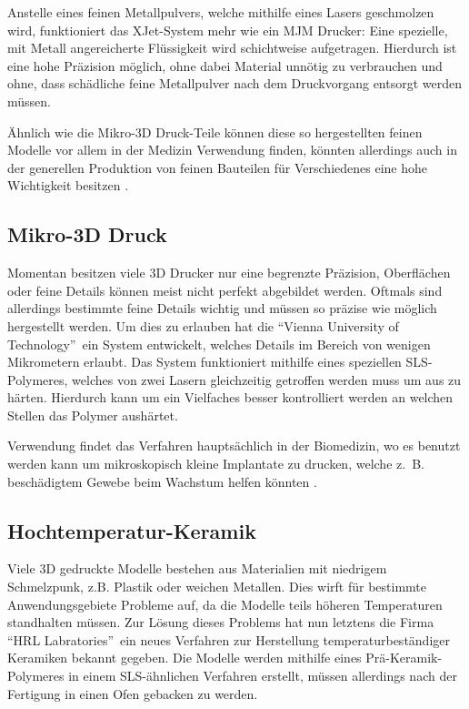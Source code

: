 Anstelle eines feinen Metallpulvers, welche mithilfe eines Lasers geschmolzen wird, funktioniert das XJet-System mehr wie ein MJM Drucker: Eine spezielle, mit Metall angereicherte Flüssigkeit wird schichtweise aufgetragen. Hierdurch ist eine hohe Präzision möglich, ohne dabei Material unnötig zu verbrauchen und ohne, dass schädliche feine Metallpulver nach dem Druckvorgang entsorgt werden müssen.

Ähnlich wie die Mikro-3D Druck-Teile können diese so hergestellten feinen Modelle vor allem in der Medizin Verwendung finden, könnten allerdings auch in der generellen Produktion von feinen Bauteilen für Verschiedenes eine hohe Wichtigkeit besitzen \parencite{XJET}.

\subsection{Mikro-3D Druck}
Momentan besitzen viele 3D Drucker nur eine begrenzte Präzision, Oberflächen oder feine Details können meist nicht perfekt abgebildet werden. Oftmals sind allerdings bestimmte feine Details wichtig und müssen so präzise wie möglich hergestellt werden. Um dies zu erlauben hat die \textquotedblleft Vienna University of Technology\textquotedblright ~ein System entwickelt, welches Details im Bereich von wenigen Mikrometern erlaubt.
Das System funktioniert mithilfe eines speziellen SLS-Polymeres, welches von zwei Lasern gleichzeitig getroffen werden muss um aus zu härten. Hierdurch kann um ein Vielfaches besser kontrolliert werden an welchen Stellen das Polymer aushärtet.

Verwendung findet das Verfahren hauptsächlich in der Biomedizin, wo es benutzt werden kann um mikroskopisch kleine Implantate zu drucken, welche z.~B. beschädigtem Gewebe beim Wachstum helfen könnten \parencite{MICROPRINT}.

\subsection{Hochtemperatur-Keramik}
Viele 3D gedruckte Modelle bestehen aus Materialien mit niedrigem Schmelzpunk, z.B. Plastik oder weichen Metallen. Dies wirft für bestimmte Anwendungsgebiete Probleme auf, da die Modelle teils höheren Temperaturen standhalten müssen. Zur Lösung dieses Problems hat nun letztens die Firma \textquotedblleft HRL Labratories\textquotedblright ~ein neues Verfahren zur Herstellung temperaturbeständiger Keramiken bekannt gegeben. Die Modelle werden mithilfe eines Prä-Keramik-Polymeres in einem SLS-ähnlichen Verfahren erstellt, müssen allerdings nach der Fertigung in einen Ofen gebacken zu werden.

